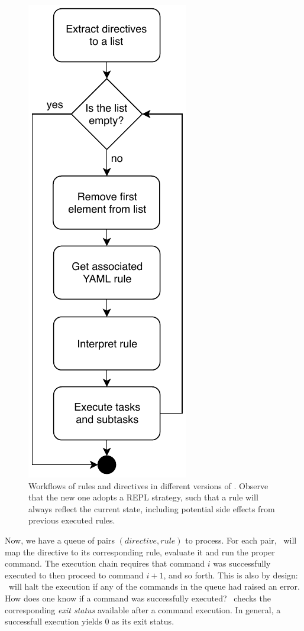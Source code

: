 \begin{figure}[htbp]
\begin{minipage}[t]{0.50\textwidth}
\vspace{1em}
\includegraphics[scale=1]{figures/v4diagram.pdf}
\end{minipage}
\caption{Workflows of rules and directives in different versions of \arara. Observe that the new one adopts a REPL strategy, such that a rule will always reflect the current state, including potential side effects from previous executed rules.}
\label{fig:workflows} 
\end{figure}

Now, we have a queue of pairs $(\textit{directive}, \textit{rule})$ to process. For each pair, \arara\ will map the directive to its corresponding rule, evaluate it and run the proper command. The execution chain requires that command $i$ was successfully executed to then proceed to command $i+1$, and so forth. This is also by design: \arara\ will halt the execution if any of the commands in the queue had raised an error. How does one know if a command was successfully executed? \arara\ checks the corresponding \emph{exit status} available after a command execution. In general, a successfull execution yields 0 as its exit status.

